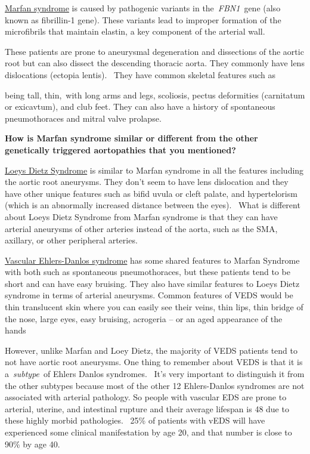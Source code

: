 \documentclass[
]{book}
\begin{document}
\underline{Marfan syndrome} is caused by pathogenic variants in
the~\emph{FBN1}~gene (also known as fibrillin-1 gene). These variants lead to
improper formation of the microfibrils that maintain elastin, a key
component of the arterial wall.~

These patients are prone to aneurysmal degeneration and dissections of
the aortic root but can also dissect the descending thoracic aorta. They
commonly have lens dislocations (ectopia lentis).~ They have common
skeletal features such as

being tall, thin,~with long arms and legs, scoliosis, pectus deformities
(carnitatum or exicavtum), and club feet. They can also have a history
of spontaneous pneumothoraces and mitral valve prolapse.

\textbf{How is Marfan syndrome similar or different from the other genetically
triggered aortopathies that you mentioned?}

\underline{Loeys Dietz Syndrome} is similar to Marfan syndrome in all the
features including the aortic root aneurysms. They don't seem to have
lens dislocation and they have other unique features such as bifid uvula
or cleft palate, and hypertelorism (which is an abnormally increased
distance between the eyes). ~What is different about Loeys Dietz
Syndrome from Marfan syndrome is that they can have arterial aneurysms
of other arteries instead of the aorta, such as the SMA, axillary, or
other peripheral arteries.

\underline{Vascular Ehlers-Danlos syndrome} has some shared features to
Marfan Syndrome with both such as spontaneous pneumothoraces, but these
patients tend to be short and can have easy bruising. They also have
similar features to Loeys Dietz syndrome in terms of arterial aneurysms.
Common features of VEDS would be thin translucent skin where you can
easily see their veins, thin lips, thin bridge of the nose, large eyes,
easy bruising, acrogeria -- or an aged appearance of the hands

However, unlike Marfan and Loey Dietz, the majority of VEDS patients
tend to not have aortic root aneurysms. One thing to remember about VEDS
is that it is a~\emph{subtype}~of Ehlers Danlos syndromes.~ It's very
important to distinguish it from the other subtypes because most of the
other 12 Ehlers-Danlos syndromes are not associated with arterial
pathology. So people with vascular EDS are prone to arterial, uterine,
and intestinal rupture and their average lifespan is 48 due to these
highly morbid pathologies.~ 25\% of patients with vEDS will have
experienced some clinical manifestation by age 20, and that number is
close to 90\% by age 40.~~~
\end{document}
